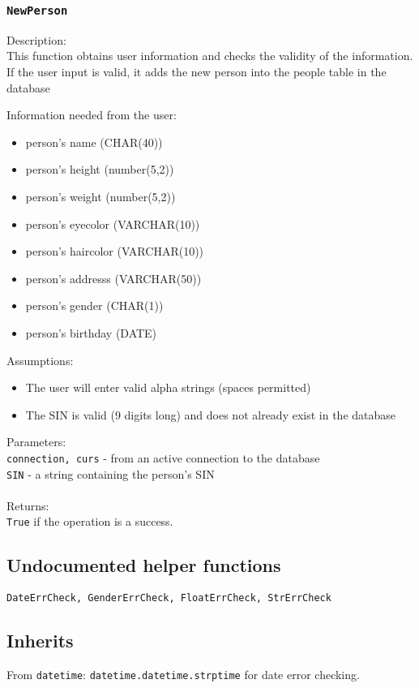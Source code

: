 \documentclass[12pt]{article}
\begin{document}
\subsubsection{\texttt{NewPerson}}
Description:\\
\indent This function obtains user information and checks the
validity of the information.
If the user input is valid, it adds the new person into
the people table in the database

Information needed from the user:
\begin{itemize}
\item person's name (CHAR(40))
\item person's height (number(5,2))
\item person's weight (number(5,2))
\item person's eyecolor (VARCHAR(10))
\item person's haircolor (VARCHAR(10))
\item person's addresss (VARCHAR(50))
\item person's gender (CHAR(1))
\item person's birthday (DATE)
\end{itemize}

\noindent Assumptions:
\begin{itemize}
\item The user will enter valid alpha strings (spaces permitted)
\item The SIN is valid (9 digits long) and does not already
      exist in the database
\end{itemize}

\noindent Parameters:\\
\indent\texttt{connection, curs} - from an active connection to the database\\
\indent\texttt{SIN} - a string containing the person's SIN\\\\
Returns:\\
\indent \texttt{True} if the operation is a success.
\subsection{Undocumented helper functions}
\texttt{DateErrCheck, GenderErrCheck, FloatErrCheck, StrErrCheck}
\subsection{Inherits}
From \texttt{datetime}: \texttt{datetime.datetime.strptime} for date error checking.
\newpage
\end{document}
